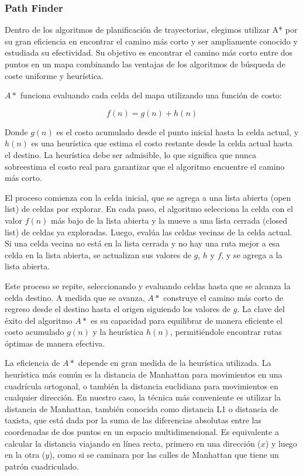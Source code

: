 \subsubsection{Path Finder}

Dentro de los algoritmos de planificación de trayectorias, elegimos utilizar A* por su gran eficiencia en encontrar el camino más corto y ser ampliamente conocido y estudiada su efectividad. Su objetivo es encontrar el camino más corto entre dos puntos en un mapa combinando las ventajas de los algoritmos de búsqueda de coste uniforme y heurística. \cite{sariffpathplan} \cite{cuevaspathfinding}

$A*$ funciona evaluando cada celda del mapa utilizando una función de costo:

$$ f(n) = g(n) + h(n) $$

Donde $g(n)$ es el costo acumulado desde el punto inicial hasta la celda actual, y $h(n)$ es una heurística que estima el costo restante desde la celda actual hasta el destino. La heurística debe ser admisible, lo que significa que nunca sobreestima el costo real para garantizar que el algoritmo encuentre el camino más corto.

El proceso comienza con la celda inicial, que se agrega a una lista abierta (open list) de celdas por explorar. En cada paso, el algoritmo selecciona la celda con el valor $f(n)$ más bajo de la lista abierta y la mueve a una lista cerrada (closed list) de celdas ya exploradas. Luego, evalúa las celdas vecinas de la celda actual. Si una celda vecina no está en la lista cerrada y no hay una ruta mejor a esa celda en la lista abierta, se actualizan sus valores de $g$, $h$ y $f$, y se agrega a la lista abierta.

Este proceso se repite, seleccionando y evaluando celdas hasta que se alcanza la celda destino. A medida que se avanza, $A*$ construye el camino más corto de regreso desde el destino hasta el origen siguiendo los valores de $g$. La clave del éxito del algoritmo $A*$ es su capacidad para equilibrar de manera eficiente el costo acumulado $g(n)$ y la heurística $h(n)$, permitiéndole encontrar rutas óptimas de manera efectiva.

La eficiencia de $A*$ depende en gran medida de la heurística utilizada. La heurística más común es la distancia de Manhattan para movimientos en una cuadrícula ortogonal, o también la distancia euclidiana para movimientos en cualquier dirección. En nuestro caso, la técnica más conveniente es utilizar la distancia de Manhattan, también conocida como distancia L1 o distancia de taxista, que está dada por la suma de las diferencias absolutas entre las coordenadas de dos puntos en un espacio multidimensional. Es equivalente a calcular la distancia viajando en línea recta, primero en una dirección ($x$) y luego en la otra ($y$), como si se caminara por las calles de Manhattan que tiene un patrón cuadriculado.

